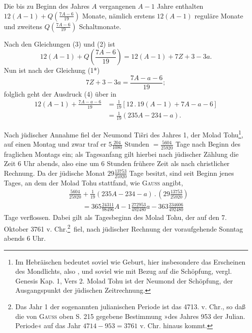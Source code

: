 Die bis zu Beginn des Jahres $A$ vergangenen $A-1$ Jahre enthalten $12(A-1)+Q\left(\frac{7A-6}{19}\right)$ Monate, nämlich erstens $12(A-1)$ reguläre Monate und zweitens $Q\left(\frac{7A-6}{19}\right)$ Schaltmonate.

Nach den Gleichungen (3) und (2) ist
\begin{equation}
12(A-1)+Q\left(\frac{7A-6}{19}\right)=12(A-1)+7Z+3-3a.\tag*{(4)}
\end{equation}
\noindent Nun ist nach der Gleichung (1*)
\[
7Z+3-3a=\frac{7A-a-6}{19};
\]
\noindent folglich geht der Ausdruck (4) über in
\[
\begin{aligned}
12(A-1)+\frac{7A-a-6}{19}
&=\frac{1}{19}[12\mathbin{.}19(A-1)+7A-a-6]\\
&=\frac{1}{19}(235A-234-a).
\end{aligned}
\]

Nach jüdischer Annahme fiel der Neumond Tišri des Jahres 1, der Molad Tohu\begingroup\renewcommand{\thefootnote}{*)}\footnote{Im Hebräischen bedeutet  soviel wie Geburt, hier insbesondere das Erscheinen des Mondlichts, also , und  soviel wie  mit Bezug auf die Schöpfung, vergl. Genesis Kap. 1, Vers 2. Molad Tohu ist der Neumond der Schöpfung, der Ausgangspunkt der jüdischen Zeitrechnung.}\endgroup, auf einen Montag und zwar traf er $5\frac{204}{1080}$ Stunden $=\frac{5604}{25920}$ Tage nach Beginn des fraglichen Montags ein; als Tagesanfang gilt hierbei nach jüdischer Zählung die Zeit 6 Uhr abends, also eine um 6 Stunden frühere Zeit als nach christlicher Rechnung. Da der jüdische Monat $29\frac{13753}{25920}$ Tage besitzt, sind seit Beginn jenes Tages, an dem der Molad Tohu stattfand, wie \textsc{Gauss} angibt,
\begin{equation}
\begin{aligned}
&\frac{5604}{25920}+\frac{1}{19}(235A-234-a)\mathbin{.}\left(29\frac{13753}{25920}\right)\\
&\qquad=365\frac{24311}{98496}A-1\frac{272953}{492480}a-363\frac{234606}{492480}
\end{aligned}\tag*{(5)}
\end{equation}
\noindent Tage verflossen. Dabei gilt als Tagesbeginn des Molad Tohu, der auf den 7. Oktober 3761 v. Chr.\begingroup\renewcommand{\thefootnote}{**)}\footnote{Das Jahr 1 der sogenannten julianischen Periode ist das 4713. v. Chr., so daß die von \textsc{Gauss} oben S. 215 gegebene Bestimmung »des Jahres 953 der Julian. Periode« auf das Jahr $4714-953=3761$ v. Chr. hinaus kommt.}\endgroup\ fiel, nach jüdischer Rechnung der voraufgehende Sonntag abends 6 Uhr.

